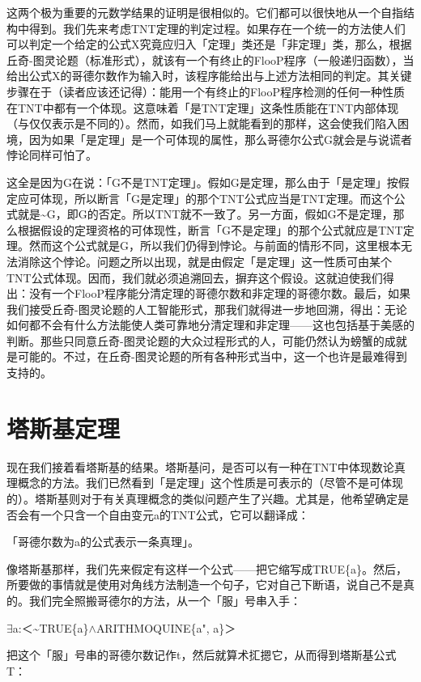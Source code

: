 \documentclass[
  12pt,
  twoside,
  openright,
  oldfontcommands,
]{memoir}
\begin{document}
这两个极为重要的元数学结果的证明是很相似的。它们都可以很快地从一个自指结构中得到。我们先来考虑TNT定理的判定过程。如果存在一个统一的方法使人们可以判定一个给定的公式X究竟应归入「定理」类还是「非定理」类，那么，根据丘奇-图灵论题（标准形式），就该有一个有终止的FlooP程序（一般递归函数），当给出公式X的哥德尔数作为输入时，该程序能给出与上述方法相同的判定。其关键步骤在于（读者应该还记得）：能用一个有终止的FlooP程序检测的任何一种性质在TNT中都有一个体现。这意味着「是TNT定理」这条性质能在TNT内部体现（与仅仅表示是不同的）。然而，如我们马上就能看到的那样，这会使我们陷入困境，因为如果「是定理」是一个可体现的属性，那么哥德尔公式G就会是与说谎者悖论同样可怕了。

这全是因为G在说：「G不是TNT定理」。假如G是定理，那么由于「是定理」按假定应可体现，所以断言「G是定理」的那个TNT公式应当是TNT定理。而这个公式就是\textasciitilde G，即G的否定。所以TNT就不一致了。另一方面，假如G不是定理，那么根据假设的定理资格的可体现性，断言「G不是定理」的那个公式就应是TNT定理。然而这个公式就是G，所以我们仍得到悖论。与前面的情形不同，这里根本无法消除这个悖论。问题之所以出现，就是由假定「是定理」这一性质可由某个TNT公式体现。因而，我们就必须追溯回去，摒弃这个假设。这就迫使我们得出：没有一个FlooP程序能分清定理的哥德尔数和非定理的哥德尔数。最后，如果我们接受丘奇-图灵论题的人工智能形式，那我们就得进一步地回溯，得出：无论如何都不会有什么方法能使人类可靠地分清定理和非定理------这也包括基于美感的判断。那些只同意丘奇-图灵论题的大众过程形式的人，可能仍然认为螃蟹的成就是可能的。不过，在丘奇-图灵论题的所有各种形式当中，这一个也许是最难得到支持的。

\section{塔斯基定理}

现在我们接着看塔斯基的结果。塔斯基问，是否可以有一种在TNT中体现数论真理概念的方法。我们已然看到「是定理」这个性质是可表示的（尽管不是可体现的）。塔斯基则对于有关真理概念的类似问题产生了兴趣。尤其是，他希望确定是否会有一个只含一个自由变元a的TNT公式，它可以翻译成：

「哥德尔数为a的公式表示一条真理」。

像塔斯基那样，我们先来假定有这样一个公式------把它缩写成TRUE\{a\}。然后，所要做的事情就是使用对角线方法制造一个句子，它对自己下断语，说自己不是真的。我们完全照搬哥德尔的方法，从一个「服」号串入手：

$\exists$a:＜\textasciitilde TRUE\{a\}$\wedge$ARITHMOQUINE\{a", a\}＞

把这个「服」号串的哥德尔数记作t，然后就算术㧟摁它，从而得到塔斯基公式T：
\end{document}
